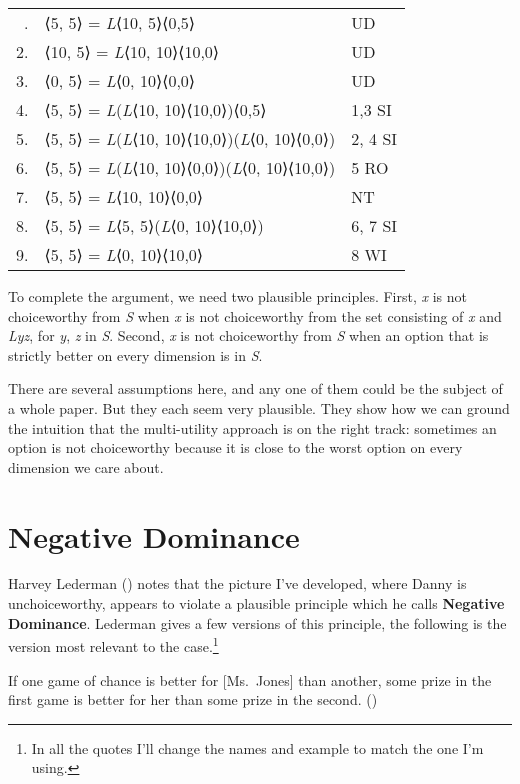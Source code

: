 \documentclass[
  11pt,
  letterpaper,
  DIV=11,
  numbers=noendperiod,
  twoside]{scrartcl}
\providecommand{\tightlist}{%
  \setlength{\itemsep}{0pt}\setlength{\parskip}{0pt}}
\begin{document}
\begin{longtable}[]{@{}rll@{}}
\toprule\noalign{}
\endhead
\bottomrule\noalign{}
\endlastfoot
1. & ⟨5, 5⟩ = \emph{L}⟨10, 5⟩⟨0,5⟩ & UD \\
2. & ⟨10, 5⟩ = \emph{L}⟨10, 10⟩⟨10,0⟩ & UD \\
3. & ⟨0, 5⟩ = \emph{L}⟨0, 10⟩⟨0,0⟩ & UD \\
4. & ⟨5, 5⟩ = \emph{L}(\emph{L}⟨10, 10⟩⟨10,0⟩)⟨0,5⟩ & 1,3 SI \\
5. & ⟨5, 5⟩ = \emph{L}(\emph{L}⟨10, 10⟩⟨10,0⟩)(\emph{L}⟨0, 10⟩⟨0,0⟩) &
2, 4 SI \\
6. & ⟨5, 5⟩ = \emph{L}(\emph{L}⟨10, 10⟩⟨0,0⟩)(\emph{L}⟨0, 10⟩⟨10,0⟩) & 5
RO \\
7. & ⟨5, 5⟩ = \emph{L}⟨10, 10⟩⟨0,0⟩ & NT \\
8. & ⟨5, 5⟩ = \emph{L}⟨5, 5⟩(\emph{L}⟨0, 10⟩⟨10,0⟩) & 6, 7 SI \\
9. & ⟨5, 5⟩ = \emph{L}⟨0, 10⟩⟨10,0⟩ & 8 WI \\
\end{longtable}

To complete the argument, we need two plausible principles. First,
\emph{x} is not choiceworthy from \emph{S} when \emph{x} is not
choiceworthy from the set consisting of \emph{x} and \emph{Lyz}, for
\emph{y}, \emph{z} in \emph{S}. Second, \emph{x} is not choiceworthy
from \emph{S} when an option that is strictly better on every dimension
is in \emph{S}.

There are several assumptions here, and any one of them could be the
subject of a whole paper. But they each seem very plausible. They show
how we can ground the intuition that the multi-utility approach is on
the right track: sometimes an option is not choiceworthy because it is
close to the worst option on every dimension we care about.

\section{Negative Dominance}\label{sec-negdom}

Harvey Lederman () notes that
the picture I've developed, where Danny is unchoiceworthy, appears to
violate a plausible principle which he calls \textbf{Negative
Dominance}. Lederman gives a few versions of this principle, the
following is the version most relevant to the case.\footnote{In all the
  quotes I'll change the names and example to match the one I'm using.}

\begin{description}
\tightlist
\item[Negative Dominance (Goodness)]
If one game of chance is better for {[}Ms.~Jones{]} than another, some
prize in the first game is better for her than some prize in the second.
()
\end{description}
\end{document}
